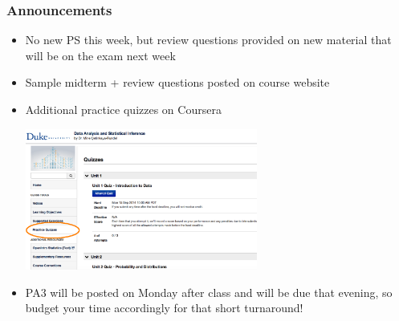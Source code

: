 \documentclass[slidestop,compress,mathserif,12pt,t,professionalfonts,xcolor=table]{beamer}
\begin{document}
\begin{frame}
\frametitle{Announcements}

\begin{itemize}

\item No new PS this week, but review questions provided on new material that will be on the exam next week

\item Sample midterm + review questions posted on course website

\item Additional practice quizzes on Coursera
\begin{center}
\includegraphics[width=0.6\textwidth]{figures/coursera_quiz}
\end{center}

\item PA3 will be posted on Monday after class and will be due that evening, so budget your time accordingly for that short turnaround!

\end{itemize}






\note{

}

\end{frame}
\end{document}
